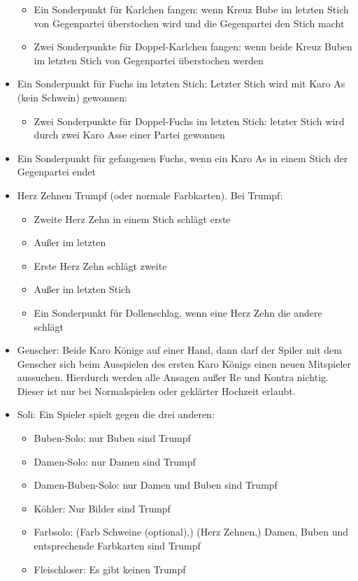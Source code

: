 \documentclass[12pt,a4paper]{article}
\begin{document}
\begin{itemize}
\begin{itemize}
\item Ein Sonderpunkt für Karlchen fangen: wenn Kreuz Bube im letzten Stich von Gegenpartei überstochen wird und
die Gegenpartei den Stich macht
\item Zwei Sonderpunkte für Doppel-Karlchen fangen: wenn beide Kreuz Buben im letzten Stich von Gegenpartei überstochen werden
\end{itemize}
\item Ein Sonderpunkt für Fuchs im letzten Stich: Letzter Stich wird mit Karo As (kein Schwein) gewonnen:
\begin{itemize}
\item Zwei Sonderpunkte für Doppel-Fuchs im letzten Stich: letzter Stich wird durch zwei Karo Asse einer Partei gewonnen
\end{itemize}
\item Ein Sonderpunkt für gefangenen Fuchs, wenn ein Karo As in einem Stich der Gegenpartei endet
\item Herz Zehnen Trumpf (oder normale Farbkarten). Bei Trumpf:
\begin{itemize}
\item Zweite Herz Zehn in einem Stich schlägt erste
\item Außer im letzten
\item Erste Herz Zehn schlägt zweite
\item Außer im letzten Stich
\item Ein Sonderpunkt für Dollenschlag, wenn eine Herz Zehn die andere schlägt
\end{itemize}
\item Genscher: Beide Karo Könige auf einer Hand, dann darf der Spiler mit dem Genscher sich beim Ausspielen
des ersten Karo Königs einen neuen Mitspieler aussuchen. Hierdurch werden alle Ansagen außer Re und Kontra nichtig.
Dieser ist nur bei Normalspielen oder geklärter Hochzeit erlaubt.
\item Soli: Ein Spieler spielt gegen die drei anderen:
\begin{itemize}
\item Buben-Solo: nur Buben sind Trumpf
\item Damen-Solo: nur Damen sind Trumpf
\item Damen-Buben-Solo: nur Damen und Buben sind Trumpf
\item Köhler: Nur Bilder sind Trumpf
\item Farbsolo: (Farb Schweine (optional),) (Herz Zehnen,) Damen, Buben und entsprechende Farbkarten sind Trumpf
\item Fleischloser: Es gibt keinen Trumpf

\end{itemize}
\end{itemize}
\end{document}
